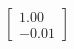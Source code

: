 \documentclass[preview]{standalone}
\begin{document}
\begin{align*}
\begin{bmatrix} 1.00 \\ -0.01 \end{bmatrix}
\end{align*}
\end{document}
